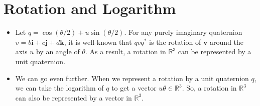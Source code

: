 \documentclass[10pt]{article}
\newcommand{\ve}[1]{\mathbf{#1}}
\newcommand{\Real}{\mathbb{R}}
\begin{document}
\section{Rotation and Logarithm}

\begin{itemize}
    \item Let $q = \cos (\theta/2) + u \sin (\theta/2)$. For any purely imaginary quaternion $v = b \ve{i} + c \ve{j} + d \ve{k}$, it is well-known that $qvq^*$ is the rotation of $\ve{v}$ around the axis $u$ by an angle of $\theta$. As a result, a rotation in $\Real^3$ can be represented by a unit quaternion.
    
    \item We can go even further. When we represent a rotation by a unit quaternion $q$, we can take the logarithm of $q$ to get a vector $u \theta \in \Real^3$. So, a rotation in $\Real^3$ can also be represented by a vector in $\Real^3$.
\end{itemize}



  
\end{document}

